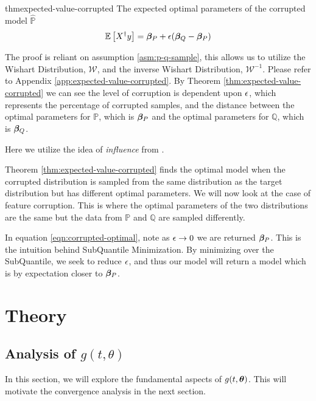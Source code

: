 \documentclass{article} %
\begin{document}
	\begin{restatable}{thm}{expected-value-corrupted}\label{thm:expected-value-corrupted}
		The expected optimal parameters of the corrupted model $\hat{\mathbb{P}}$\vspace{1em}
		\begin{equation}
			\label{eqn:corrupted-optimal}
			\mathbb{E}\left[X^{\dagger}y \right] = {\bm{\beta}}_P + {\epsilon}({\bm{\beta}}_Q - {\bm{\beta}}_P)
		\end{equation}
	\end{restatable}
	The proof is reliant on assumption \ref{asm:p-q-sample}, this allows us to utilize the Wishart Distribution, $\mathcal{W}$, and the inverse Wishart Distribution, $\mathcal{W}^{-1}$. Please refer to Appendix \ref{app:expected-value-corrupted}. By Theorem \ref{thm:expected-value-corrupted} we can see the level of corruption is dependent upon ${\epsilon}$, which represents the percentage of corrupted samples, and the distance between the optimal parameters for $\mathbb{P}$, which is ${\bm{\beta}}_P$ and the optimal parameters for $\mathbb{Q}$, which is ${\bm{\beta}}_Q$. 
	
		
	Here we utilize the idea of \textit{influence} from \cite{McWilliams2014}.
	
	Theorem \ref{thm:expected-value-corrupted} finds the optimal model when the corrupted distribution is sampled from the same distribution as the target distribution but has different optimal parameters. We will now look at the case of feature corruption. This is where the optimal parameters of the two distributions are the same but the data from $\mathbb{P}$ and $\mathbb{Q}$ are sampled differently. 
	
	In equation \ref{eqn:corrupted-optimal}, note as $\displaystyle {\epsilon} \to 0$ we are returned ${\bm{\beta}}_P$. This is the intuition behind SubQuantile Minimization. By minimizing over the SubQuantile, we seek to reduce ${\epsilon}$, and thus our model will return a model which is by expectation closer to ${\bm{\beta}}_P$. 	

	\section{Theory} 
	
	\subsection{Analysis of $g(t,\theta)$}
	
	In this section, we will explore the fundamental aspects of $g(t,{\bm{\theta}})$. This will motivate the convergence analysis in the next section.
	
\end{document}
